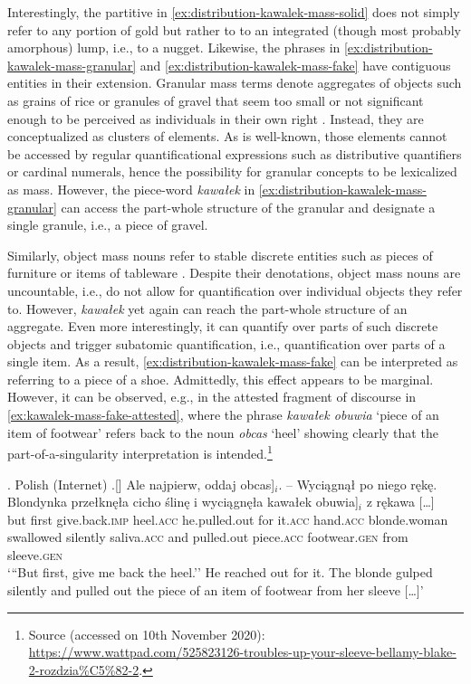 Interestingly, the partitive in \ref{ex:distribution-kawalek-mass-solid} does not simply refer to any portion of gold but rather to to an integrated (though most probably amorphous) lump, i.e., to a nugget. Likewise, the phrases in \ref{ex:distribution-kawalek-mass-granular} and \ref{ex:distribution-kawalek-mass-fake} have contiguous entities in their extension. Granular mass terms denote aggregates of objects such as grains of rice or granules of gravel that seem too small or not significant enough to be perceived as individuals in their own right \citep{grimm2012number,sutton_filip2016mass}. Instead, they are conceptualized as clusters of elements. As is well-known, those elements cannot be accessed by regular quantificational expressions such as distributive quantifiers or cardinal numerals, hence the possibility for granular concepts to be lexicalized as mass. However, the piece-word \textit{kawałek} in \ref{ex:distribution-kawalek-mass-granular} can access the part-whole structure of the granular and designate a single granule, i.e., a piece of gravel. 

Similarly, object mass nouns refer to stable discrete entities such as pieces of furniture or items of tableware \citep{gillon1992towards,chierchia1998plurality,chierchia2010mass,barner_snedeker2005quantity,bale_barner2009interpretation,rothstein2010counting,landman2011count}. Despite  their denotations, object mass nouns are uncountable, i.e., do not allow for quantification over individual objects they refer to. However, \textit{kawałek} yet again can reach the part-whole structure of an aggregate. Even more interestingly, it can quantify over parts of such discrete objects and trigger subatomic quantification, i.e., quantification over parts of a single item. As a result, \ref{ex:distribution-kawalek-mass-fake} can be interpreted as referring to a piece of a shoe. Admittedly, this effect appears to be marginal. However, it can be observed, e.g., in the attested fragment of discourse in \ref{ex:kawalek-mass-fake-attested}, where the phrase \textit{kawałek obuwia} `piece of an item of footwear' refers back to the noun \textit{obcas} `heel' showing clearly that the part-of-a-singularity interpretation is intended.\footnote{Source (accessed on 10th November 2020): \url{https://www.wattpad.com/525823126-troubles-up-your-sleeve-bellamy-blake-2-rozdzia\%C5\%82-2}.}

\ex. Polish (Internet)
\bg.[] Ale najpierw, oddaj \minsp{[} obcas]$_i$. -- Wyciągnął po niego rękę. Blondynka przełknęła cicho ślinę i wyciągnęła\hspace{3pt} \minsp{[} kawałek obuwia]$_i$ z rękawa [\dots]\\
but first give.back\textsc{.imp} {} heel\textsc{.acc} {} he.pulled.out for it\textsc{.acc} hand\textsc{.acc} blonde.woman swallowed silently saliva\textsc{.acc} and pulled.out {} piece\textsc{.acc} footwear\textsc{.gen} from sleeve\textsc{.gen} {}\\
`{``}But first, give me back the heel.'' He reached out for it. The blonde gulped silently and pulled out the piece of an item of footwear from her sleeve [\dots]'\label{ex:kawalek-mass-fake-attested}

